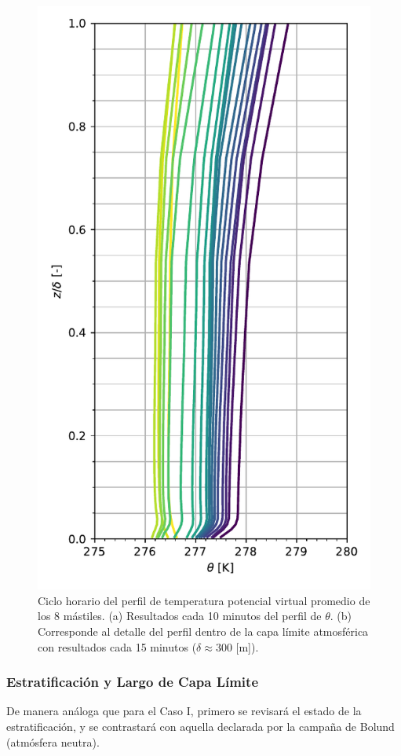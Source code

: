 \begin{figure}[H]
	\begin{minipage}{0.5\linewidth}
		\centering
		\includegraphics[width=0.9\linewidth,trim={0cm 5mm 0cm 0cm},clip]{Imagenes/06/bol/mean_profile}%
	\end{minipage}%
	
	\caption{Ciclo horario del perfil de temperatura potencial virtual promedio de los 8 mástiles. (a) Resultados cada 10 minutos del perfil de $\theta$. (b) Corresponde al detalle del perfil dentro de la capa límite atmosférica con resultados cada 15 minutos ($\delta\approx300$ [m]).}
	\label{fig:06_bol_pbl}
\end{figure}

\subsubsection{Estratificación y Largo de Capa Límite}
De manera análoga que para el Caso I, primero se revisará el estado de la estratificación, y se contrastará con aquella declarada por la campaña de Bolund (atmósfera neutra). 

